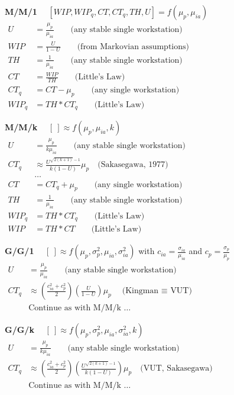 \documentclass[11pt]{article}
\begin{document}
\noindent  \textbf{M/M/1}  ~~$[WIP, WIP_q, CT, CT_q, TH, U] = f(\mu_p, \mu_{ia})$
\begin{align*}
U 		&= \frac{\mu_p}{\mu_{ia}}	\qquad	\text{(any stable single workstation)}\\
WIP 	&= \frac{U}{1-U}	\qquad	\text{(from Markovian assumptions)} \qquad \qquad \qquad \qquad \qquad \qquad \qquad \qquad\\
TH		&= \frac{1}{\mu_{ia}}	\qquad	\text{(any stable single workstation)}\\
CT		&= \frac{WIP}{TH}	\qquad	\text{(Little's Law)}\\
CT_q	&= CT - \mu_p 	\qquad	\text{(any single workstation)}\\
WIP_q	&= TH * CT_q	\qquad	\text{(Little's Law)}
\end{align*}

\noindent  \textbf{M/M/k}  ~~$[~] \approx f(\mu_p, \mu_{ia}, k)$
\begin{align*}
U 		&= \frac{\mu_p}{k \mu_{ia}}		\qquad	\text{(any stable single workstation)} \qquad \qquad \qquad \qquad \qquad \qquad \qquad \qquad \quad\\
CT_q	&\approx \frac{U^{\sqrt{2(k+1)}-1}}{k(1-U)} \mu_p 	\quad	\text{(Sakasegawa, 1977)}\\
		&\hdots\\
CT		&= CT_q + \mu_p 	\qquad	\text{(any single workstation)}\\
TH		&= \frac{1}{\mu_{ia}}	\qquad	\text{(any stable single workstation)}\\
WIP_q	&= TH * CT_q	\qquad	\text{(Little's Law)}\\
WIP	&= TH * CT	\qquad	\text{(Little's Law)}
\end{align*}

\noindent  \textbf{G/G/1}  ~~$[~] \approx f(\mu_p, \sigma^2_p, \mu_{ia}, \sigma^2_{ia})$ with $c_{ia} = \frac{\sigma_{ia}}{\mu_{ia}}$ and $c_p = \frac{\sigma_p}{\mu_p}$
\begin{align*}
U 		&= \frac{\mu_p}{\mu_{ia}}	\qquad	\text{(any stable single workstation)}\\
CT_q	&\approx \left( \frac{c_{ia}^2 + c_p^2}{2} \right)  \left( \frac{U}{1-U} \right)  \mu_p 	\quad	\text{(Kingman $\equiv$ VUT)} \qquad \qquad \qquad \qquad \qquad \qquad \qquad\\
		&\text{Continue as with M/M/k \ldots}
\end{align*}

\noindent  \textbf{G/G/k}  ~~$[~] \approx f(\mu_p, \sigma^2_p, \mu_{ia}, \sigma^2_{ia}, k)$
\begin{align*}
U 		&= \frac{\mu_p}{k \mu_{ia}}		\qquad	\text{(any stable single workstation)}\\
CT_q	&\approx \left( \frac{c_{ia}^2 + c_p^2}{2} \right)  \left( \frac{U^{\sqrt{2(k+1)}-1}}{k(1-U)} \right)  \mu_p 	\quad	\text{(VUT, Sakasegawa)} \qquad \qquad \qquad \qquad \qquad \qquad \qquad \qquad\\
		&\text{Continue as with M/M/k \ldots}
\end{align*}
\end{document}
